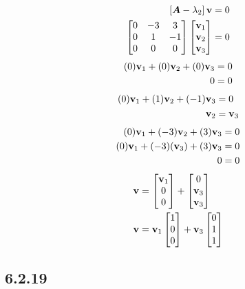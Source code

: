 \documentclass{article}
\begin{document}
\begin{align*}
	\left[ \matr{A} - \lambda_2 \right] \vect{v} & = 0 \\
	\begin{bmatrix}
		0 & -3 & 3 \\
		0 & 1 & -1 \\
		0 & 0 & 0
	\end{bmatrix}
	\begin{bmatrix} \vect{v}_1 \\ \vect{v}_2 \\ \vect{v}_3 \end{bmatrix} & = 0
\end{align*}
\begin{align*}
	(0)\vect{v}_1 + (0)\vect{v}_2 + (0)\vect{v}_3 & = 0 \\
	0 & = 0
\end{align*}
\begin{align*}
	(0)\vect{v}_1 + (1)\vect{v}_2 + (-1)\vect{v}_3 & = 0 \\
	\vect{v}_2 & = \vect{v}_3
\end{align*}
\begin{align*}
	(0)\vect{v}_1 + (-3)\vect{v}_2 + (3)\vect{v}_3 & = 0 \\
	(0)\vect{v}_1 + (-3)(\vect{v}_3) + (3)\vect{v}_3 & = 0 \\
	0 & = 0
\end{align*}
\begin{align*}
	\vect{v} & =
		\begin{bmatrix} \vect{v}_1 \\ 0 \\ 0 \end{bmatrix}
		+ \begin{bmatrix} 0 \\ \vect{v}_3 \\ \vect{v}_3 \end{bmatrix} \\
	\vect{v} & =
		\vect{v}_1 \begin{bmatrix} 1 \\ 0 \\ 0 \end{bmatrix}
		+ \vect{v}_3 \begin{bmatrix} 0 \\ 1 \\ 1 \end{bmatrix}
\end{align*}

\subsection{6.2.19}
\end{document}
